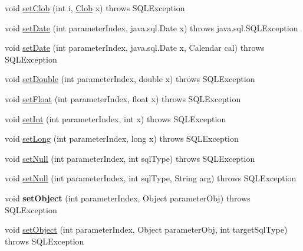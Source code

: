 \begin{DoxyCompactItemize}
\item 
void \mbox{\hyperlink{classcom_1_1mysql_1_1jdbc_1_1_prepared_statement_afede5384371c1526e48fe4a923bc2292}{set\+Clob}} (int i, \mbox{\hyperlink{classcom_1_1mysql_1_1jdbc_1_1_clob}{Clob}} x)  throws S\+Q\+L\+Exception 
\item 
void \mbox{\hyperlink{classcom_1_1mysql_1_1jdbc_1_1_prepared_statement_a7fff0e5cc0d3a8205620da02c39f4673}{set\+Date}} (int parameter\+Index, java.\+sql.\+Date x)  throws java.\+sql.\+S\+Q\+L\+Exception 
\item 
void \mbox{\hyperlink{classcom_1_1mysql_1_1jdbc_1_1_prepared_statement_aea55e79f823b386bf3525f1f147cd272}{set\+Date}} (int parameter\+Index, java.\+sql.\+Date x, Calendar cal)  throws S\+Q\+L\+Exception 
\item 
void \mbox{\hyperlink{classcom_1_1mysql_1_1jdbc_1_1_prepared_statement_a9be27733e4e54e675dd6eaf238380e02}{set\+Double}} (int parameter\+Index, double x)  throws S\+Q\+L\+Exception 
\item 
void \mbox{\hyperlink{classcom_1_1mysql_1_1jdbc_1_1_prepared_statement_a68b6271f340188dc794c5bc4418705cb}{set\+Float}} (int parameter\+Index, float x)  throws S\+Q\+L\+Exception 
\item 
void \mbox{\hyperlink{classcom_1_1mysql_1_1jdbc_1_1_prepared_statement_ae9efafe8af966733befb3f271c7d902c}{set\+Int}} (int parameter\+Index, int x)  throws S\+Q\+L\+Exception 
\item 
void \mbox{\hyperlink{classcom_1_1mysql_1_1jdbc_1_1_prepared_statement_a56039ead85e37c1c6d019cb62f584ef9}{set\+Long}} (int parameter\+Index, long x)  throws S\+Q\+L\+Exception 
\item 
void \mbox{\hyperlink{classcom_1_1mysql_1_1jdbc_1_1_prepared_statement_ab885f67afaf798c888f537898f82809e}{set\+Null}} (int parameter\+Index, int sql\+Type)  throws S\+Q\+L\+Exception 
\item 
void \mbox{\hyperlink{classcom_1_1mysql_1_1jdbc_1_1_prepared_statement_a52e34d1cb0264c8eb6f8bac60385e446}{set\+Null}} (int parameter\+Index, int sql\+Type, String arg)  throws S\+Q\+L\+Exception 
\item 
\mbox{\label{classcom_1_1mysql_1_1jdbc_1_1_prepared_statement_aaf9923fc3cd5ada90b7e7ca5f8d7ba5e}} 
void {\bfseries set\+Object} (int parameter\+Index, Object parameter\+Obj)  throws S\+Q\+L\+Exception 
\item 
void \mbox{\hyperlink{classcom_1_1mysql_1_1jdbc_1_1_prepared_statement_a9e69a72bbaef62df845abee77bde90ef}{set\+Object}} (int parameter\+Index, Object parameter\+Obj, int target\+Sql\+Type)  throws S\+Q\+L\+Exception 

\end{DoxyCompactItemize}
